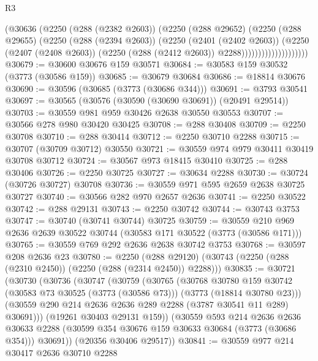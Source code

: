 \begin{lexlean}{R3}
\begin{coremodule}
                            (@30636
                              (@2250
                                (@288 (@2382 @2603))
                                (@2250
                                  (@288 @29652)
                                  (@2250
                                    (@288 @29655)
                                    (@2250
                                      (@288 (@2394 @2603))
                                      (@2250
                                        (@2401 (@2402 @2603))
                                        (@2250
                                          (@2407 (@2408 @2603))
                                          (@2250 (@288 (@2412 @2603)) @2288))))))))))))))))))))
@30679 := @30600 @30676 @159 @30571
@30684 := @30583 @159 @30532 (@3773 (@30586 @159))
@30685 := @30679 @30684
@30686 := @18814 @30676
@30690 := @30596 (@30685 (@3773 (@30686 @344)))
@30691 := @3793 @30541
@30697 := @30565 (@30576 (@30590 (@30690 @30691)) (@20491 @29514))
@30703 := @30559 @981 @959 @30426 @2638 @30550 @30553
@30707 := @30566 @278 @980 @30420 @30425
@30708 := @288 @30408
@30709 := @2250 @30708
@30710 := @288 @30414
@30712 := @2250 @30710 @2288
@30715 := @30707 (@30709 @30712) @30550
@30721 := @30559 @974 @979 @30411 @30419 @30708 @30712
@30724 := @30567 @973 @18415 @30410
@30725 := @288 @30406
@30726 := @2250 @30725
@30727 := @30634 @2288
@30730 := @30724 (@30726 @30727) @30708
@30736 := @30559 @971 @595 @2659 @2638 @30725 @30727
@30740 := @30566 @282 @970 @2657 @2636
@30741 := @2250 @30522
@30742 := @288 @29131
@30743 := @2250 @30742
@30744 := @30743 @3753
@30747 := @30740 (@30741 @30744) @30725
@30759 := @30559 @210 @969 @2636 @2639 @30522 @30744 (@30583 @171 @30522 (@3773 (@30586 @171)))
@30765 := @30559 @769 @292 @2636 @2638 @30742 @3753
@30768 := @30597 @208 @2636 @23
@30780 := @2250
    (@288 @29120)
    (@30743 (@2250 (@288 (@2310 @2450)) (@2250 (@288 (@2314 @2450)) @2288)))
@30835 := @30721
    (@30730
      (@30736
        (@30747
          (@30759
            (@30765
              (@30768
                @30780
                @159
                @30742
                (@30583 @73 @30525 (@3773 (@30586 @73)))
                (@3773 (@18814 @30780 @23)))
              (@30559 @290 @214 @2636 @2636 @289 @2288 (@3787 @30541 @11 @289) @30691)))
          (@19261 @30403 @29131 @159))
        (@30559
          @593
          @214
          @2636
          @2636
          @30633
          @2288
          (@30599 @354 @30676 @159 @30633 @30684 (@3773 (@30686 @354)))
          @30691))
      (@20356 @30406 @29517))
@30841 := @30559 @977 @214 @30417 @2636 @30710 @2288

\end{coremodule}
\end{lexlean}
